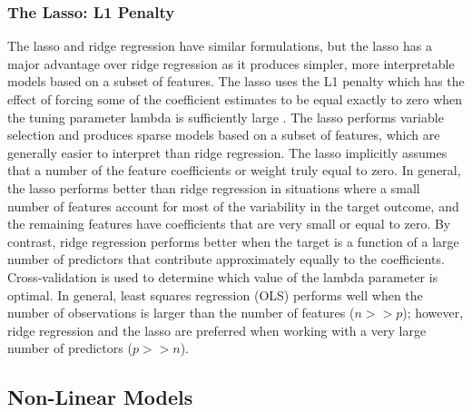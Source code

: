\documentclass[sigconf]{acmart}
\begin{document}

\subsubsection{The Lasso: L1 Penalty} 

The lasso and ridge regression have similar formulations, but the lasso has 
a major advantage over ridge regression as it produces simpler, more 
interpretable models based on a subset of features. The lasso uses the L1 
penalty which has the effect of forcing some of the coefficient estimates to be
equal exactly to zero when the tuning parameter lambda is sufficiently large 
\cite{kuhn13}. The lasso performs variable selection and produces sparse models 
based on a subset of features, which are generally easier to interpret than 
ridge regression. The lasso implicitly assumes that a number of the feature 
coefficients or weight truly equal to zero. In general, the lasso performs 
better than ridge regression in situations where a small number of features 
account for most of the variability in the target outcome, and the remaining 
features have coefficients that are very small or equal to zero. By contrast, 
ridge regression performs better when the target is a function 
of a large number of predictors that contribute approximately equally to the
coefficients. Cross-validation is used to determine which value of the lambda 
parameter is optimal. In general, least squares regression (OLS) performs well 
when the number of observations is larger than the number of features ($\textit{n}>>\textit{p}$); however, ridge regression and the lasso are 
preferred when working with a very large number of predictors ($\textit{p}>>\textit{n}$).


\subsection{Non-Linear Models}
\end{document}
